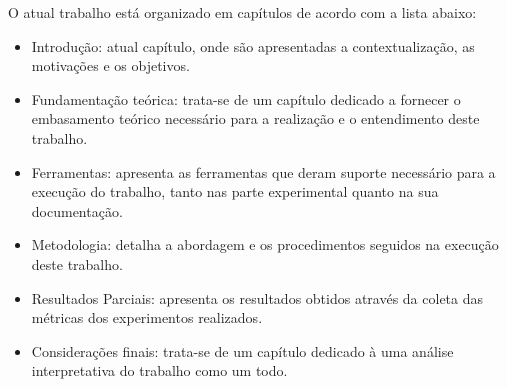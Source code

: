 O atual trabalho está organizado em capítulos de acordo com a lista abaixo:
\begin{itemize}
    \item Introdução: atual capítulo, onde são apresentadas a contextualização, as motivações e os objetivos.
    \item Fundamentação teórica: trata-se de um capítulo dedicado a fornecer o embasamento teórico necessário para a realização e o entendimento deste trabalho.
    \item Ferramentas: apresenta as ferramentas que deram suporte necessário para a execução do trabalho, tanto nas parte experimental quanto na sua documentação.
    \item Metodologia: detalha a abordagem e os procedimentos seguidos na execução deste trabalho.
    \item Resultados Parciais: apresenta os resultados obtidos através da coleta das métricas dos experimentos realizados.
    \item Considerações finais: trata-se de um capítulo dedicado à uma análise interpretativa do trabalho como um todo.
\end{itemize}


